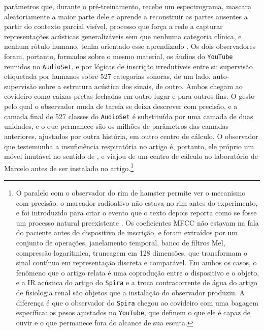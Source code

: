 parâmetros que, durante o pré-treinamento, recebe um espectrograma, mascara aleatoriamente a maior parte dele e aprende a reconstruir as partes ausentes a partir do contexto parcial visível, processo que força a rede a capturar representações acústicas generalizáveis sem que nenhuma categoria clínica, e nenhum rótulo humano, tenha orientado esse aprendizado \parencite{Gauy2025Contrasting}. Os dois observadores foram, portanto, formados sobre o mesmo material, os áudios do \texttt{YouTube} reunidos no \texttt{AudioSet}, e por lógicas de inscrição irredutíveis entre si: supervisão etiquetada por humanos sobre 527 categorias sonoras, de um lado, auto-supervisão sobre a estrutura acústica dos sinais, de outro. Ambos chegam ao covideiro como caixas-pretas fechadas em outro lugar e para outros fins. O gesto pelo qual o observador muda de tarefa se deixa descrever com precisão, e a camada final de 527 classes do \texttt{AudioSet} é substituída por uma camada de duas unidades, e o que permanece são os milhões de parâmetros das camadas anteriores, ajustados por outra história, em outro centro de cálculo. O observador que testemunha a insuficiência respiratória no artigo é, portanto, ele próprio um móvel imutável no sentido de \textcite{Latour2011CienciaEmAcao}, e viajou de um centro de cálculo ao laboratório de Marcelo antes de ser instalado no artigo.\footnote{O paralelo com o observador do rim de hamster permite ver o mecanismo com precisão: o marcador radioativo não estava no rim antes do experimento, e foi introduzido para criar o evento que o texto depois reporta como se fosse um processo natural preexistente \parencite[pp.~53--54]{Latour1986Writing}. Os coeficientes MFCC não estavam na fala do paciente antes do dispositivo de inscrição, e foram extraídos por um conjunto de operações, janelamento temporal, banco de filtros Mel, compressão logarítmica, truncagem em 128 dimensões, que transformam o sinal contínuo em representação discreta e comparável. Em ambos os casos, o fenômeno que o artigo relata é uma coprodução entre o dispositivo e o objeto, e a IR acústica do artigo do \texttt{Spira} e a troca contracorrente de água do artigo de fisiologia renal são objetos que a instalação do observador produziu. A diferença é que o observador do \texttt{Spira} chegou ao covideiro com uma bagagem específica: os pesos ajustados no \texttt{YouTube}, que definem o que ele é capaz de ouvir e o que permanece fora do alcance de sua escuta.}


